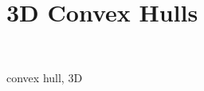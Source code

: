 \chapter{3D Convex Hulls}
\label{chap:convex_hull_3}
 \\

\begin{ccPackage}{convex hull, 3D}


\end{ccPackage}


